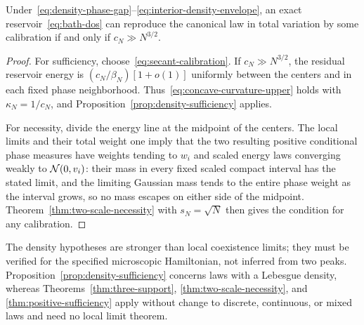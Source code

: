 \begin{corollary}
\label{cor:density-physical-iff}
Under~\eqref{eq:density-phase-gap}--\eqref{eq:interior-density-envelope},
an exact reservoir~\eqref{eq:bath-dos} can reproduce the canonical law
in total variation by some calibration if and only if
$c_N\gg N^{3/2}$.
\end{corollary}
\begin{proof}
For sufficiency, choose~\eqref{eq:secant-calibration}. If
$c_N\gg N^{3/2}$, the residual reservoir energy is
$(c_N/\beta_N)[1+o(1)]$ uniformly between the centers and in each
fixed phase neighborhood. Thus~\eqref{eq:concave-curvature-upper}
holds with $\kappa_N=1/c_N$, and
Proposition~\ref{prop:density-sufficiency} applies.

For necessity, divide the energy line at the midpoint of the centers.
The local limits and their total weight one imply that the two
resulting positive conditional phase measures have weights tending to
$w_i$ and scaled energy laws converging weakly to $\mathcal N(0,v_i)$:
their mass in every fixed scaled compact interval has the stated
limit, and the limiting Gaussian mass tends to the entire phase weight
as the interval grows, so no mass escapes on either side of the
midpoint. Theorem~\ref{thm:two-scale-necessity} with $s_N=\sqrt N$
then gives the condition for any calibration.
\end{proof}

The density hypotheses are stronger than local coexistence limits;
they must be verified for the specified microscopic Hamiltonian, not
inferred from two peaks.
Proposition~\ref{prop:density-sufficiency} concerns laws with a
Lebesgue density, whereas Theorems~\ref{thm:three-support},
\ref{thm:two-scale-necessity}, and \ref{thm:positive-sufficiency}
apply without change to discrete, continuous, or mixed laws and need
no local limit theorem.
